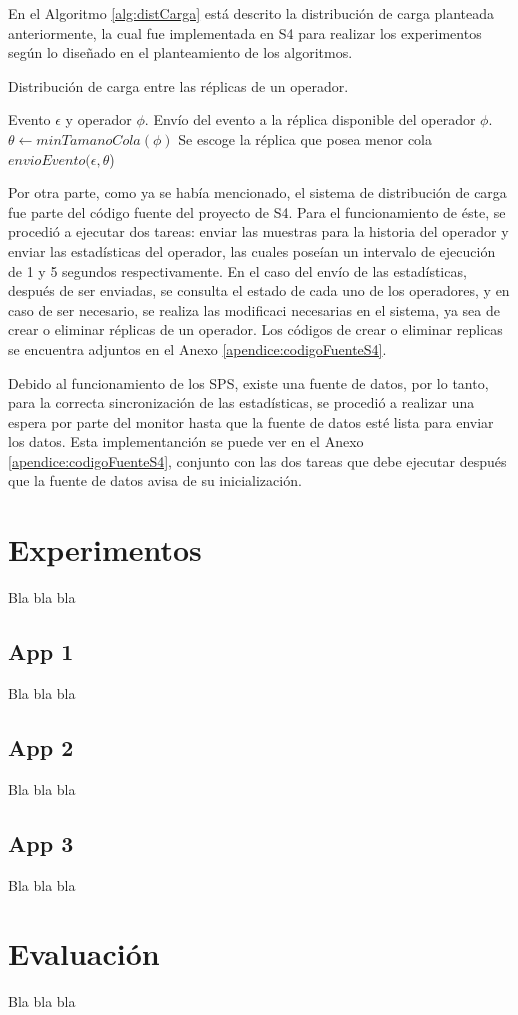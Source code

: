 En el Algoritmo \ref{alg:distCarga} está descrito la distribución de carga planteada anteriormente, la cual fue implementada en S4 para realizar los experimentos según lo diseñado en el planteamiento de los algoritmos.

\begin{algorithm}[!ht]
	\caption{Distribución de carga entre las réplicas de un operador.}
	\label{alg:distCarga}
	\begin{algorithmic}[1]
	\REQUIRE Evento $\epsilon$ y operador $\phi$.
	\ENSURE Envío del evento a la réplica disponible del operador $\phi$.
	\STATE $\theta \leftarrow minTamanoCola(\phi)$ \COMMENT Se escoge la réplica que posea menor cola
	\STATE $envioEvento(\epsilon,\theta$)
	\end{algorithmic}
\end{algorithm}

Por otra parte, como ya se había mencionado, el sistema de distribución de carga fue parte del código fuente del proyecto de S4. Para el funcionamiento de éste, se procedió a ejecutar dos tareas: enviar las muestras para la historia del operador y enviar las estadísticas del operador, las cuales poseían un intervalo de ejecución de 1 y 5 segundos respectivamente. En el caso del envío de las estadísticas, después de ser enviadas, se consulta el estado de cada uno de los operadores, y en caso de ser necesario, se realiza las modificaci necesarias en el sistema, ya sea de crear o eliminar réplicas de un operador. Los códigos de crear o eliminar replicas se encuentra adjuntos en el Anexo \ref{apendice:codigoFuenteS4}.

Debido al funcionamiento de los SPS, existe una fuente de datos, por lo tanto, para la correcta sincronización de las estadísticas, se procedió a realizar una espera por parte del monitor hasta que la fuente de datos esté lista para enviar los datos. Esta implementanción se puede ver en el Anexo \ref{apendice:codigoFuenteS4}, conjunto con las dos tareas que debe ejecutar después que la fuente de datos avisa de su inicialización.

\section{Experimentos}
Bla bla bla

\subsection{App 1}
Bla bla bla

\subsection{App 2}
Bla bla bla

\subsection{App 3}
Bla bla bla

\section{Evaluación}

Bla bla bla
